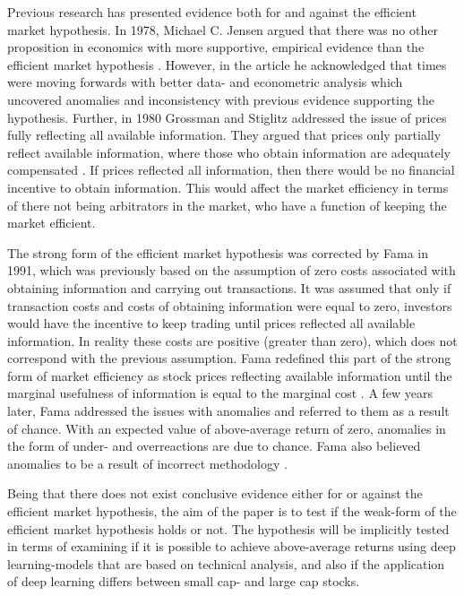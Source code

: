 \indent \newline 
Previous research has presented evidence both for and against the efficient market hypothesis. In 1978, Michael C. Jensen argued that there was no other proposition in economics with more supportive, empirical evidence than the efficient market hypothesis \cite{JENSEN}. However, in the article he acknowledged that times were moving forwards with better data- and econometric analysis which uncovered anomalies and inconsistency with previous evidence supporting the hypothesis. Further, in 1980 Grossman and Stiglitz addressed the issue of prices fully reflecting all available information. They argued that prices only partially reflect available information, where those who obtain information are adequately compensated  \cite{stiglitz}. If prices reflected all information, then there would be no financial incentive to obtain information. This would affect the market efficiency in terms of there not being arbitrators in the market, who have a function of keeping the market efficient.

\indent \newline 
The strong form of the efficient market hypothesis was corrected by Fama in 1991, which was previously based on the assumption of zero costs associated with obtaining information and carrying out transactions. It was assumed that only if transaction costs and costs of obtaining information were equal to zero, investors would have the incentive to keep trading until prices reflected all available information. In reality these costs are positive (greater than zero), which does not correspond with the previous assumption. Fama redefined this part of the strong form of market efficiency as stock prices reflecting available information until the marginal usefulness of information is equal to the marginal cost \cite{lekovic}. A few years later, Fama addressed the issues with anomalies and referred to them as a result of chance. With an expected value of above-average return of zero, anomalies in the form of under- and overreactions are due to chance. Fama also believed anomalies to be a result of incorrect methodology \cite{lekovic}.

\indent \newline 
Being that there does not exist conclusive evidence either for or against the efficient market hypothesis, the aim of the paper is to test if the weak-form of the efficient market hypothesis holds or not. The hypothesis will be implicitly tested in terms of examining if it is possible to achieve above-average returns using deep learning-models that are based on technical analysis, and also if the application of deep learning differs between small cap- and large cap stocks.   

